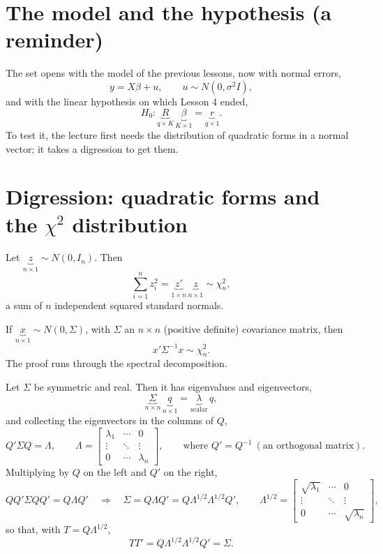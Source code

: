 \documentclass[11pt]{article}
\begin{document}

\section{The model and the hypothesis (a reminder)}

The set opens with the model of the previous lessons, now with normal errors,
\[ y = X\beta + u, \qquad u \sim N(0, \sigma^{2}I), \]
and with the linear hypothesis on which Lesson 4 ended,
\[ H_{0} : \underbrace{R}_{q\times K}\,\underbrace{\beta}_{K\times1}
   = \underbrace{r}_{q\times1}. \]
To test it, the lecture first needs the distribution of quadratic forms in a
normal vector; it takes a digression to get them.

\section{Digression: quadratic forms and the $\chi^{2}$ distribution}

Let $\underbrace{z}_{n\times1} \sim N(0, I_{n})$. Then
\[ \sum_{i=1}^{n} z_{i}^{2}
   = \underbrace{z'}_{1\times n}\,\underbrace{z}_{n\times1} \sim \chi^{2}_{n}, \]
a sum of $n$ independent squared standard normals.

If $\underbrace{x}_{n\times1} \sim N(0, \Sigma)$, with $\Sigma$ an $n\times n$
(positive definite) covariance matrix, then
\[ x'\Sigma^{-1}x \sim \chi^{2}_{n}. \]
The proof runs through the spectral decomposition.

Let $\Sigma$ be symmetric and real. Then it has eigenvalues and eigenvectors,
\[ \underbrace{\Sigma}_{n\times n}\,\underbrace{q}_{n\times1} = \underbrace{\lambda}_{\text{scalar}}\,q, \]
and collecting the eigenvectors in the columns of $Q$,
\[ Q'\Sigma Q = \Lambda, \qquad
   \Lambda = \begin{bmatrix} \lambda_{1} & \cdots & 0\\ \vdots & \ddots & \vdots\\ 0 & \cdots & \lambda_{n} \end{bmatrix},
   \qquad\text{where } Q' = Q^{-1} \ (\text{an orthogonal matrix}). \]
Multiplying by $Q$ on the left and $Q'$ on the right,
\[ QQ'\Sigma QQ' = Q\Lambda Q' \quad\Longrightarrow\quad
   \Sigma = Q\Lambda Q' = Q\Lambda^{1/2}\Lambda^{1/2}Q', \qquad
   \Lambda^{1/2} = \begin{bmatrix} \sqrt{\lambda_{1}} & \cdots & 0\\ \vdots & \ddots & \vdots\\ 0 & \cdots & \sqrt{\lambda_{n}} \end{bmatrix}, \]
so that, with $T = Q\Lambda^{1/2}$,
\[ TT' = Q\Lambda^{1/2}\Lambda^{1/2}Q' = \Sigma. \]
\end{document}
